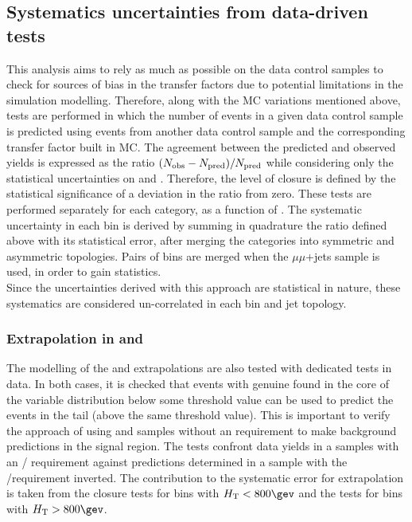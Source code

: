 \subsection{Systematics uncertainties from data-driven tests}
\label{sec:closure-tests}
This analysis aims to rely as much as possible on the data control samples
to check for sources of bias in the transfer factors due to potential limitations in
the simulation modelling. 
Therefore, along with the MC variations mentioned above, tests are performed 
in which the number of events in a given data control sample is predicted 
using events from another data control sample and the corresponding transfer factor built in MC. 
The agreement between the predicted and observed yields is
expressed as the ratio $(N_{\textrm{obs}} - N_{\textrm{pred}})/N_{\textrm{pred}}$ while considering only
the statistical uncertainties on \npre and \nobs. Therefore, the level
of closure is defined by the statistical significance of a deviation
in the ratio from zero.
These tests are performed separately for each \njet category, as a function of \scalht. 
The systematic uncertainty in each \scalht bin is derived by summing in quadrature the ratio 
defined above with its statistical error, after merging the \njet categories into symmetric and asymmetric topologies. 
Pairs of \scalht bins are merged when the $\mu\mu$+jets sample is used, in order to gain statistics. \\
Since the uncertainties derived with this approach are statistical in nature, 
these systematics are considered un-correlated in each \scalht bin and jet topology. 


\subsubsection*{Extrapolation in \alphat and \bdphi}
\label{sec:tfSyst_alphaT}
The modelling of the \alphat and
\bdphi extrapolations are also tested with dedicated tests in data. 
In both cases, it is checked that events with genuine \met found in the core
of the variable distribution below some threshold value can be used to
predict the events in the tail (above the same threshold value).
This is important to verify the
approach of using \mj and \mmj samples without an \alphat requirement
to make background predictions in the signal region. The tests
confront data yields in a \mj  samples with an \alphat /\bdphi
requirement against predictions determined in a \mj sample with
the \alphat /\bdphi requirement inverted. 
The contribution to the systematic error for \met extrapolation is taken
from the \alphat closure tests for bins with $\scalht<800\gev$ and
the \bdphi tests for bins with $\scalht>800\gev$. 

